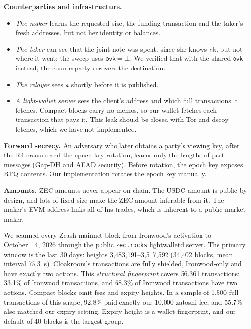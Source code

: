 \documentclass[10pt,letterpaper]{article}
\makeatletter
\renewcommand\subsection{\@startsection{subsection}{2}{\z@}{-0.9em}{0.25em}{\normalfont\normalsize\bfseries}}
\theoremstyle{plain}
\theoremstyle{definition}
\newcommand{\nk}{\mathsf{nk}}
\newcommand{\ovk}{\mathsf{ovk}}
\newcommand{\fn}[1]{\texttt{#1}}
\makeatother
\begin{document}
\textbf{Counterparties and infrastructure.}
\begin{itemize}\setlength\itemsep{0.05em}
\item \emph{The maker} learns the requested size, the funding transaction and the taker's fresh
addresses, but not her identity or balances.
\item \emph{The taker} can see that the joint note was spent, since she knows $\nk$, but not where
it went: the sweep uses $\ovk=\bot$. We verified that with the shared $\ovk$ instead, the
counterparty recovers the destination.
\item \emph{The relayer} sees $a$ shortly before it is published.
\item \emph{A light-wallet server} sees the client's address and which full transactions it
fetches. Compact blocks carry no memos, so our wallet fetches each transaction that pays it.
This leak should be closed with Tor and decoy fetches, which we have not implemented.
\end{itemize}

\textbf{Forward secrecy.} An adversary who later obtains a party's viewing key, after the R4
erasure and the epoch-key rotation, learns only the lengths of past messages (Gap-DH and AEAD
security). Before rotation, the epoch key exposes RFQ contents. Our implementation rotates the
epoch key manually.

\textbf{Amounts.} ZEC amounts never appear on chain. The USDC amount is public by design, and lots
of fixed size make the ZEC amount inferable from it. The maker's EVM address links all of his
trades, which is inherent to a public market maker.

\subsection{Measured anonymity sets}
We scanned every Zcash mainnet block from Ironwood's activation to October~14, 2026 through the
public \fn{zec.rocks} lightwalletd server. The primary window is the last 30 days: heights
3{,}483{,}191--3{,}517{,}592 (34{,}402 blocks, mean interval 75.3~s). Cloakroom's transactions
are fully shielded, Ironwood-only and have exactly two actions. This \emph{structural fingerprint}
covers 56{,}361 transactions: 33.1\% of Ironwood transactions, and 68.3\% of Ironwood transactions
have two actions. Compact blocks omit fees and expiry heights. In a sample of 1{,}500 full
transactions of this shape, 92.8\% paid exactly our 10{,}000-zatoshi fee, and 55.7\% also matched
our expiry setting. Expiry height is a wallet fingerprint, and our default of 40 blocks is the
largest group.
\end{document}
